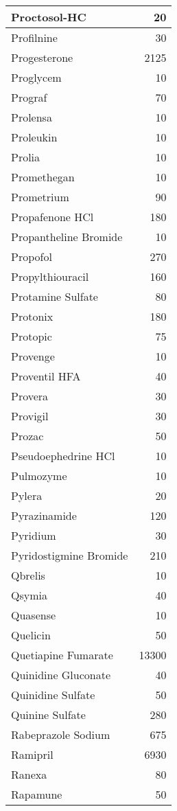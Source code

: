 \documentclass[
]{article}
\begin{document}
\begin{table}
\begin{tabular}[t]{l|r}
Proctosol-HC & 20\\
\hline
Profilnine & 30\\
\hline
Progesterone & 2125\\
\hline
Proglycem & 10\\
\hline
Prograf & 70\\
\hline
Prolensa & 10\\
\hline
Proleukin & 10\\
\hline
Prolia & 10\\
\hline
Promethegan & 10\\
\hline
Prometrium & 90\\
\hline
Propafenone HCl & 180\\
\hline
Propantheline Bromide & 10\\
\hline
Propofol & 270\\
\hline
Propylthiouracil & 160\\
\hline
Protamine Sulfate & 80\\
\hline
Protonix & 180\\
\hline
Protopic & 75\\
\hline
Provenge & 10\\
\hline
Proventil HFA & 40\\
\hline
Provera & 30\\
\hline
Provigil & 30\\
\hline
Prozac & 50\\
\hline
Pseudoephedrine HCl & 10\\
\hline
Pulmozyme & 10\\
\hline
Pylera & 20\\
\hline
Pyrazinamide & 120\\
\hline
Pyridium & 30\\
\hline
Pyridostigmine Bromide & 210\\
\hline
Qbrelis & 10\\
\hline
Qsymia & 40\\
\hline
Quasense & 10\\
\hline
Quelicin & 50\\
\hline
Quetiapine Fumarate & 13300\\
\hline
Quinidine Gluconate & 40\\
\hline
Quinidine Sulfate & 50\\
\hline
Quinine Sulfate & 280\\
\hline
Rabeprazole Sodium & 675\\
\hline
Ramipril & 6930\\
\hline
Ranexa & 80\\
\hline
Rapamune & 50\\

\end{tabular}
\end{table}
\end{document}
